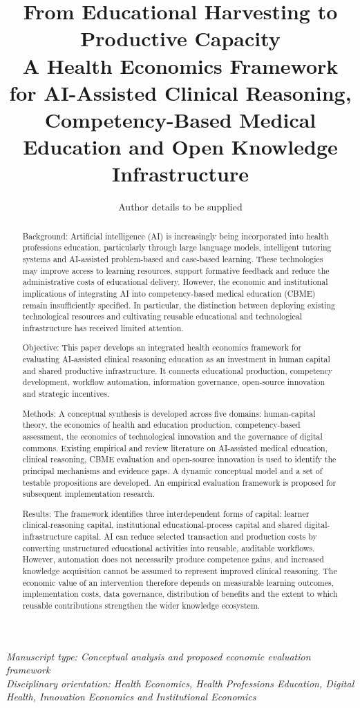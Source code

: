 \documentclass[11pt,a4paper]{article}
\title{\textbf{From Educational Harvesting to Productive Capacity}\\[0.5em]\large A Health Economics Framework for AI-Assisted Clinical Reasoning, Competency-Based Medical Education and Open Knowledge Infrastructure}
\author{Author details to be supplied}
\date{}
\begin{document}
\maketitle
\noindent\textit{Manuscript type: Conceptual analysis and proposed economic evaluation framework\\Disciplinary orientation: Health Economics, Health Professions Education, Digital Health, Innovation Economics and Institutional Economics}
\begin{abstract}
Background: Artificial intelligence (AI) is increasingly being incorporated into health professions education, particularly through large language models, intelligent tutoring systems and AI-assisted problem-based and case-based learning. These technologies may improve access to learning resources, support formative feedback and reduce the administrative costs of educational delivery. However, the economic and institutional implications of integrating AI into competency-based medical education (CBME) remain insufficiently specified. In particular, the distinction between deploying existing technological resources and cultivating reusable educational and technological infrastructure has received limited attention.

Objective: This paper develops an integrated health economics framework for evaluating AI-assisted clinical reasoning education as an investment in human capital and shared productive infrastructure. It connects educational production, competency development, workflow automation, information governance, open-source innovation and strategic incentives.

Methods: A conceptual synthesis is developed across five domains: human-capital theory, the economics of health and education production, competency-based assessment, the economics of technological innovation and the governance of digital commons. Existing empirical and review literature on AI-assisted medical education, clinical reasoning, CBME evaluation and open-source innovation is used to identify the principal mechanisms and evidence gaps. A dynamic conceptual model and a set of testable propositions are developed. An empirical evaluation framework is proposed for subsequent implementation research.

Results: The framework identifies three interdependent forms of capital: learner clinical-reasoning capital, institutional educational-process capital and shared digital-infrastructure capital. AI can reduce selected transaction and production costs by converting unstructured educational activities into reusable, auditable workflows. However, automation does not necessarily produce competence gains, and increased knowledge acquisition cannot be assumed to represent improved clinical reasoning. The economic value of an intervention therefore depends on measurable learning outcomes, implementation costs, data governance, distribution of benefits and the extent to which reusable contributions strengthen the wider knowledge ecosystem.


\end{abstract}
\end{document}
